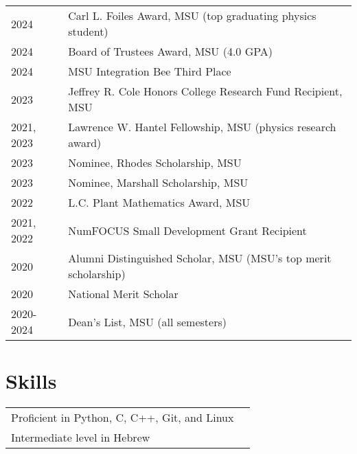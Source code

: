 \documentclass[letterpaper,12pt]{article}
\begin{document}
\begin{tabularx}{\linewidth}{@{}l X@{}}	
2024 & Carl L. Foiles Award, MSU (top graduating physics student) \\
2024 & Board of Trustees Award, MSU (4.0 GPA) \\
2024 & MSU Integration Bee Third Place \\
2023 & Jeffrey R. Cole Honors College Research Fund Recipient, MSU \\
2021, 2023 & Lawrence W. Hantel Fellowship, MSU (physics research award) \\
2023 & Nominee, Rhodes Scholarship, MSU \\
2023 & Nominee, Marshall Scholarship, MSU \\
2022 & L.C. Plant Mathematics Award, MSU \\
2021, 2022 & NumFOCUS Small Development Grant Recipient \\
2020 & Alumni Distinguished Scholar, MSU (MSU's top merit scholarship) \\
2020 & National Merit Scholar \\
2020-2024 & Dean's List, MSU (all semesters) \\
\end{tabularx}


\section{Skills}

\begin{tabularx}{\linewidth}{@{}l X@{}}
Proficient in Python, C, C++, Git, and Linux \\
Intermediate level in Hebrew \\  
\end{tabularx}

\vfill
{}
\end{document}
